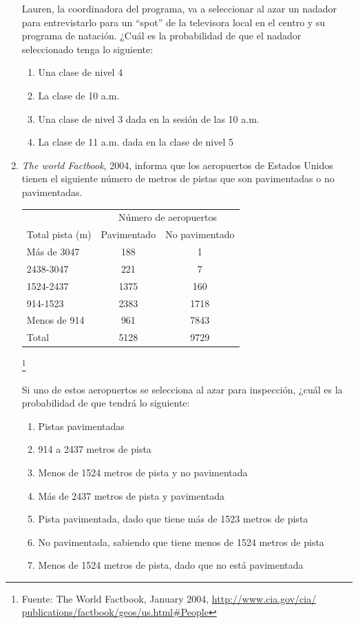 \documentclass[10pt,twoside]{article}
\begin{document}
\begin{enumerate}
\begin{center}
\end{center}
Lauren, la coordinadora del programa, va a seleccionar al azar un nadador para entrevistarlo para un “spot” de la televisora local en el centro y su programa de natación. ¿Cuál es la probabilidad de que el nadador seleccionado tenga lo siguiente:
\begin{enumerate}
\item Una clase de nivel 4
\item La clase de 10 a.m.
\item Una clase de nivel 3 dada en la sesión de las 10 a.m.
\item La clase de 11 a.m. dada en la clase de nivel 5
\end{enumerate}
\item \textit{The world Factbook}, 2004, informa que los aeropuertos de Estados Unidos tienen el siguiente número de metros de pistas que son pavimentadas o no pavimentadas.
\begin{center}
\begin{tabular}{lcc}
 & \multicolumn{2}{c}{Número de aeropuertos} \\ 
Total pista (m) & Pavimentado & No pavimentado \\\hline 
Más de 3047 & 188 & 1 \\ 
2438-3047 & 221 & 7 \\ 
1524-2437 & 1375 & 160 \\ 
914-1523 & 2383 & 1718 \\ 
Menos de 914 & 961 & 7843 \\ \hline
Total & 5128 & 9729 \\ 
\hline 
\end{tabular} \footnote{Fuente: The World Factbook, January 2004, \url{http://www.cia.gov/cia/
publications/factbook/geos/us.html#People}
}
\end{center}
Si uno de estos aeropuertos se selecciona al azar para inspección, ¿cuál es la probabilidad de que tendrá lo siguiente:
\begin{enumerate}
\item Pistas pavimentadas
\item 914 a 2437 metros de pista
\item Menos de 1524 metros de pista y no pavimentada
\item Más de 2437 metros de pista y pavimentada
\item Pista pavimentada, dado que tiene más de 1523 metros de pista
\item No pavimentada, sabiendo que tiene menos de 1524 metros de pista
\item Menos de 1524 metros de pista, dado que no está pavimentada
\end{enumerate}
\end{enumerate}
\end{document}
